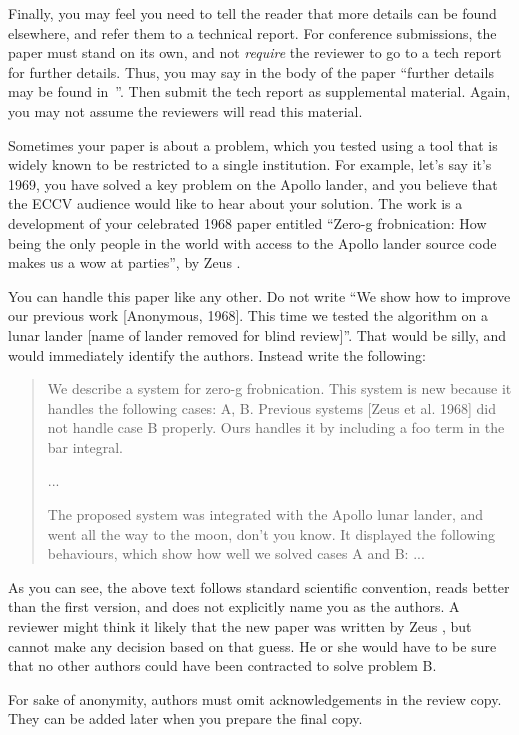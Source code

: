 \documentclass[runningheads]{llncs}
\begin{document}
Finally, you may feel you need to tell the reader that more details can be found elsewhere, and refer them to a technical report.
For conference submissions, the paper must stand on its own, and not \emph{require} the reviewer to go to a tech report for further details.
Thus, you may say in the body of the paper ``further details may be found in~\cite{Anonymous24b}''.
Then submit the tech report as supplemental material.
Again, you may not assume the reviewers will read this material.

Sometimes your paper is about a problem, which you tested using a tool that is widely known to be restricted to a single institution.
For example, let's say it's 1969, you have solved a key problem on the Apollo lander, and you believe that the ECCV audience would like to hear about your
solution.
The work is a development of your celebrated 1968 paper entitled ``Zero-g frobnication: How being the only people in the world with access to the Apollo lander source code makes us a wow at parties'', by Zeus \etal.

You can handle this paper like any other.
Do not write ``We show how to improve our previous work [Anonymous, 1968].
This time we tested the algorithm on a lunar lander [name of lander removed for blind review]''.
That would be silly, and would immediately identify the authors.
Instead write the following:
\begin{quotation}
   We describe a system for zero-g frobnication.
   This system is new because it handles the following cases:
   A, B.  Previous systems [Zeus et al. 1968] did not  handle case B properly.
   Ours handles it by including a foo term in the bar integral.

   ...

   The proposed system was integrated with the Apollo lunar lander, and went all the way to the moon, don't you know.
   It displayed the following behaviours, which show how well we solved cases A and B: ...
\end{quotation}
As you can see, the above text follows standard scientific convention, reads better than the first version, and does not explicitly name you as the authors.
A reviewer might think it likely that the new paper was written by Zeus \etal, but cannot make any decision based on that guess.
He or she would have to be sure that no other authors could have been contracted to solve problem B.

For sake of anonymity, authors must omit acknowledgements in the review copy. 
They can be added later when you prepare the final copy.
\end{document}
